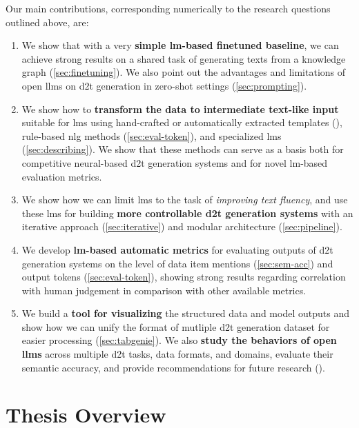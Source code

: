 Our main contributions, corresponding numerically to the research questions outlined above, are:
\begin{enumerate}
    \item We show that with a very \textbf{simple \ac{lm}-based finetuned baseline}, we can achieve strong results on a shared task of generating texts from a knowledge graph (\autoref{sec:finetuning}). We also point out the advantages and limitations of open \acp{llm} on \ac{d2t} generation in zero-shot settings (\autoref{sec:prompting}).
    \item We show how to \textbf{transform the data to intermediate text-like input} suitable for \acp{lm} using hand-crafted or automatically extracted templates (), rule-based \ac{nlg} methods (\autoref{sec:eval-token}), and specialized \acp{lm} (\autoref{sec:describing}). We show that these methods can serve as a basis both for competitive neural-based \ac{d2t} generation systems and for novel \ac{lm}-based evaluation metrics.
    \item We show how we can limit \acp{lm} to the task of \textit{improving text fluency}, and use these \acp{lm} for building \textbf{more controllable \ac{d2t} generation systems} with an iterative approach (\autoref{sec:iterative}) and modular architecture (\autoref{sec:pipeline}).
    \item We develop \textbf{\ac{lm}-based automatic metrics} for evaluating outputs of \ac{d2t} generation systems on the level of data item mentions (\autoref{sec:sem-acc}) and output tokens (\autoref{sec:eval-token}), showing strong results regarding correlation with human judgement in comparison with other available metrics.
    \item We build a \textbf{tool for visualizing} the structured data and model outputs and show how we can unify the format of mutliple \ac{d2t} generation dataset for easier processing (\autoref{sec:tabgenie}). We also \textbf{study the behaviors of open \acp{llm}} across multiple \ac{d2t} tasks, data formats, and domains, evaluate their semantic accuracy, and provide recommendations for future research ().
\end{enumerate}



\section{Thesis Overview}
\label{sec:overview}

